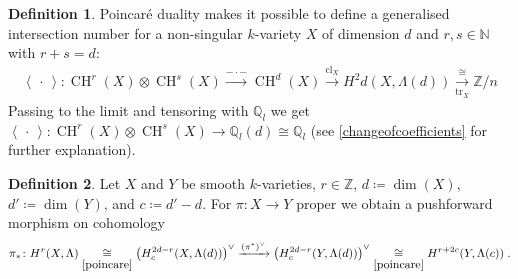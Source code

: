 \documentclass[english]{scrartcl}
\theoremstyle{definition}
\newtheorem{Def}{Definition}[section]
\newtheorem{Cor}[Def]{Corollary}
\theoremstyle{remark}
\newcommand*{\N}{\mathds{N}}
\newcommand*{\Z}{\mathds{Z}}
\newcommand*{\Q}{\mathds{Q}}
\newcommand*{\Zmod}[1]{\Z/#1} %
\newcommand*{\Zl}{\Z_l} %
\newcommand*{\Ql}{\Q_l} %
\newcommand*{\Tr}{\text{tr}} %
\newcommand*{\intProd}[2]{{#1\cdot#2}} %
\newcommand*{\intNum}[1]{{\left\langle{#1}\right\rangle}} %
\DeclareMathOperator{\CH}{CH} %
\DeclareMathOperator{\CL}{cl} %
\begin{document}
\begin{Def}
  Poincaré duality makes it possible to define a generalised
  intersection number for a non-singular $k$-variety $X$
  of dimension $d$ and $r,s\in\N$ with $r+s=d$:
  \begin{gather*}
    \intNum{\,\cdot\,}\colon
    \CH^r(X)\otimes\CH^s(X)
    \xrightarrow{\intProd{-}{-}} \CH^{d}(X)
    \xrightarrow{\CL_X} H^2d(X,\Lambda(d))
    \xrightarrow[\Tr_X]{\cong} \Zmod{n}
  \end{gather*}
  Passing to the limit and tensoring with $\Ql$ we get
  $\intNum{\,\cdot\,}\colon\CH^r(X)\otimes\CH^s(X)\to\Ql(d)\cong\Ql$
  (see \ref{changeofcoefficients} for further explanation).
\end{Def}



\begin{Def}\label{def:pushforward}
  Let $X$ and $Y$ be smooth $k$-varieties, $r\in\Z$,
  $d\coloneqq\dim(X)$, $d'\coloneqq\dim(Y)$, and $c\coloneqq d'-d$.
  For $\pi\colon X\to Y$ proper we obtain a pushforward morphism on
  cohomology
  \begin{gather*}
    \pi_*\colon
    H^r(X,\Lambda)
    \underset{\ref{poincare}}\cong
    \left(H_c^{2d-r}(X,\Lambda(d))\right)^\vee
    \xrightarrow{(\pi^*)^\vee}
    \left(H_c^{2d-r}(Y,\Lambda(d))\right)^\vee
    \underset{\ref{poincare}}\cong
    H^{r+2c}(Y,\Lambda(c))
    \;.
  \end{gather*}
\end{Def}
\end{document}
